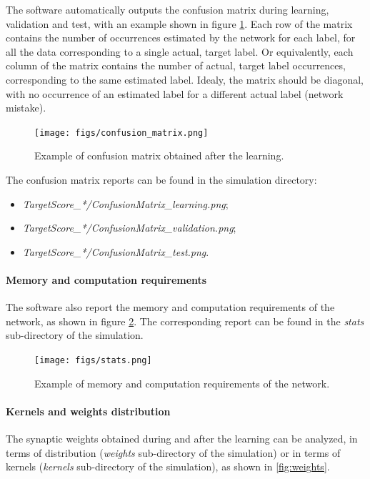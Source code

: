 \documentclass[a4paper,11pt,oneside]{article}
\newenvironment{myitemize}
{ \begin{itemize}
    \setlength{\itemsep}{0pt}
    \setlength{\parskip}{0pt}
    \setlength{\parsep}{0pt}     }
{ \end{itemize}                  }
\begin{document}
The software automatically outputs the confusion matrix during learning,
validation and test, with an example shown in figure \ref{fig:ConfusionMatrix}.
Each row of the matrix contains the number of occurrences estimated by the
 network for each label, for all the data corresponding to a single actual,
 target label.
Or equivalently, each column of the matrix contains the number of actual,
target label occurrences, corresponding to the same estimated label.
Idealy, the matrix should be diagonal, with no occurrence of an estimated
 label for a different actual label (network mistake).

\begin{figure}[!htb]
  \centering
  \texttt{[image: figs/confusion\_matrix.png]}
  \caption{Example of confusion matrix obtained after the learning.}
  \label{fig:ConfusionMatrix}
\end{figure}

The confusion matrix reports can be found in the simulation directory:
\begin{myitemize}
\item \emph{TargetScore\_*/ConfusionMatrix\_learning.png};
\item \emph{TargetScore\_*/ConfusionMatrix\_validation.png};
\item \emph{TargetScore\_*/ConfusionMatrix\_test.png}.
\end{myitemize}

\paragraph{Memory and computation requirements}

The software also report the memory and computation requirements of the network,
 as shown in figure \ref{fig:stats}. The corresponding report can be found in
 the \emph{stats} sub-directory of the simulation.

\begin{figure}[!htb]
  \centering
  \texttt{[image: figs/stats.png]}
  \caption{Example of memory and computation requirements of the network.}
  \label{fig:stats}
\end{figure}


\paragraph{Kernels and weights distribution}

The synaptic weights obtained during and after the learning can be analyzed,
in terms of distribution (\emph{weights} sub-directory of the simulation) or in
terms of kernels (\emph{kernels} sub-directory of the simulation), as shown
in \ref{fig:weights}.
\end{document}
